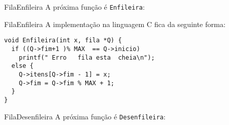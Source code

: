 \documentclass[aspectratio=169]{beamer}
\begin{document}

\begin{frame}[fragile]{Fila}{Enfileira}
A próxima função é \verb|Enfileira|:
\begin{algorithm}[H]
\caption{Enfileira} 
\label{Enfileira}
\end{algorithm}

\end{frame}


\begin{frame}[fragile]{Fila}{Enfileira}
A implementação na linguagem C fica da seguinte forma:

\begin{lstlisting}[style=CStyle]
void Enfileira(int x, fila *Q) { 
  if ((Q->fim+1 )% MAX  == Q->inicio)
    printf(" Erro   fila esta  cheia\n");
  else { 
    Q->itens[Q->fim - 1] = x;
    Q->fim = Q->fim % MAX + 1;
  }
} 
\end{lstlisting}  
\end{frame}


\begin{frame}[fragile]{Fila}{Desenfileira}
A próxima função é \verb|Desenfileira|:
\begin{algorithm}[H]
\caption{Desenfileira} 
\label{Desenfileira}
\end{algorithm}
\end{frame}
\end{document}

